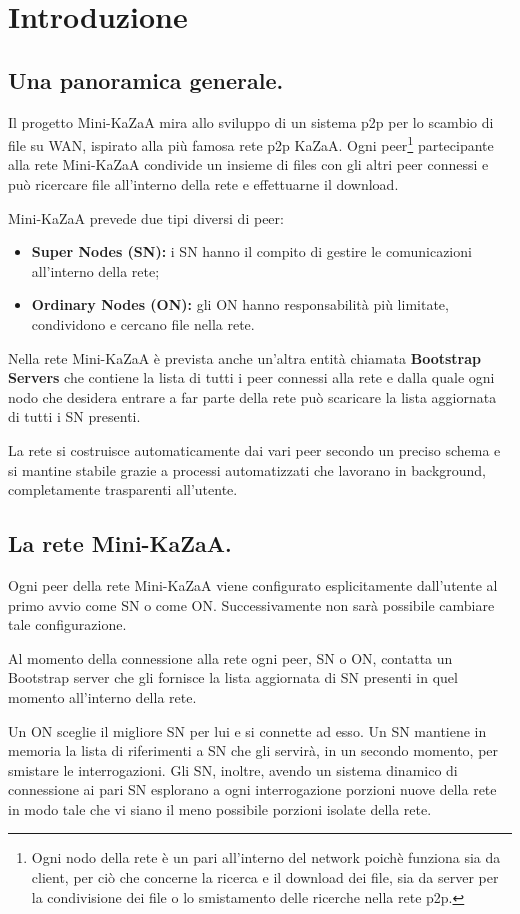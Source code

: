 \chapter{Introduzione}
\section{Una panoramica generale.}
Il progetto Mini-KaZaA mira allo sviluppo di un sistema p2p per lo scambio di file su WAN, ispirato alla più famosa
rete p2p KaZaA.
Ogni peer\footnote{Ogni nodo della rete è un pari all'interno del network poichè funziona sia da client, per ciò che concerne la ricerca e il download dei file, sia da server per la condivisione dei file o lo smistamento delle ricerche nella rete p2p.} partecipante alla rete Mini-KaZaA condivide un insieme di files con gli altri peer connessi e può ricercare file all'interno della rete e effettuarne il download.

Mini-KaZaA prevede due tipi diversi di peer:
\begin{itemize}
 \item \textbf{Super Nodes (SN): }i SN hanno il compito di gestire le comunicazioni all'interno della rete;
 \item \textbf{Ordinary Nodes (ON): }gli ON hanno responsabilità più limitate, condividono e cercano file nella rete.
\end{itemize}

Nella rete Mini-KaZaA è prevista anche un'altra entità chiamata \textbf{Bootstrap Servers} che contiene la lista di tutti i peer connessi alla rete e dalla quale ogni nodo che desidera entrare a far parte della rete può scaricare la lista aggiornata di tutti i SN presenti.

La rete si costruisce automaticamente dai vari peer secondo un preciso schema e si mantine stabile grazie a processi automatizzati che lavorano in background, completamente trasparenti all'utente.

\section{La rete Mini-KaZaA.}
Ogni peer della rete Mini-KaZaA viene configurato esplicitamente dall'utente al primo avvio come SN o come ON. Successivamente non sarà possibile cambiare tale configurazione.

Al momento della connessione alla rete ogni peer, SN o ON, contatta un Bootstrap server che gli fornisce la lista aggiornata di SN presenti in quel momento all'interno della rete.

Un ON sceglie il migliore SN per lui e si connette ad esso. Un SN mantiene in memoria la lista di riferimenti a SN che gli servirà, in un secondo momento, per smistare le interrogazioni. Gli SN, inoltre, avendo un sistema dinamico di connessione ai pari SN esplorano a ogni interrogazione porzioni nuove della rete in modo tale che vi siano il meno possibile porzioni isolate della rete. 
